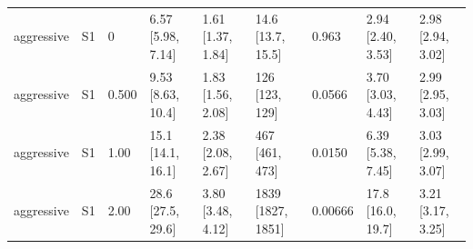 \begin{table}[htbp]
{\begin{tabular}{lllllllll}
aggressive & S1 & 0 & 6.57 [5.98, 7.14] & 1.61 [1.37, 1.84] & 14.6 [13.7, 15.5] & 0.963 & 2.94 [2.40, 3.53] & 2.98 [2.94, 3.02] \\
aggressive & S1 & 0.500 & 9.53 [8.63, 10.4] & 1.83 [1.56, 2.08] & 126 [123, 129] & 0.0566 & 3.70 [3.03, 4.43] & 2.99 [2.95, 3.03] \\
aggressive & S1 & 1.00 & 15.1 [14.1, 16.1] & 2.38 [2.08, 2.67] & 467 [461, 473] & 0.0150 & 6.39 [5.38, 7.45] & 3.03 [2.99, 3.07] \\
aggressive & S1 & 2.00 & 28.6 [27.5, 29.6] & 3.80 [3.48, 4.12] & 1839 [1827, 1851] & 0.00666 & 17.8 [16.0, 19.7] & 3.21 [3.17, 3.25] \\
\bottomrule
\end{tabular}}
\end{table}
